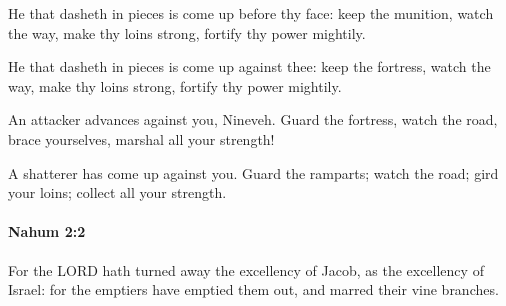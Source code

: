 			He that dasheth in pieces is come up before thy face: keep the munition, watch the way, make thy loins strong, fortify thy power mightily.

			\begin{versebox}
					\item[BHS] 
					\item[LXX] 
					\item[ASV] He that dasheth in pieces is come up against thee: keep the fortress, watch the way, make thy loins strong, fortify thy power mightily.
					\item[NIV] An attacker advances against you, Nineveh. Guard the fortress, watch the road, brace yourselves, marshal all your strength!
					\item[NRSV] A shatterer has come up against you. Guard the ramparts; watch the road; gird your loins; collect all your strength.
			\end{versebox}

		\paragraph{Nahum 2:2} %
			\label{NAHUM-2-2}

			For the LORD hath turned away the excellency of Jacob, as the excellency of Israel: for the emptiers have emptied them out, and marred their vine branches.

